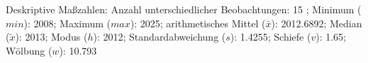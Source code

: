 				\vspace*{-\baselineskip}
                    \begin{noten}
                	    \note{} Deskriptive Maßzahlen:
                	    Anzahl unterschiedlicher Beobachtungen: 15%
                	    ; 
                	      Minimum ($min$): 2008; 
                	      Maximum ($max$): 2025; 
                	      arithmetisches Mittel ($\bar{x}$): \num[round-mode=places,round-precision=2]{2012.6892}; 
                	      Median ($\tilde{x}$): 2013; 
                	      Modus ($h$): 2012; 
                	      Standardabweichung ($s$): \num[round-mode=places,round-precision=2]{1.4255}; 
                	      Schiefe ($v$): \num[round-mode=places,round-precision=2]{1.65}; 
                	      Wölbung ($w$): \num[round-mode=places,round-precision=2]{10.793}
                     \end{noten}

